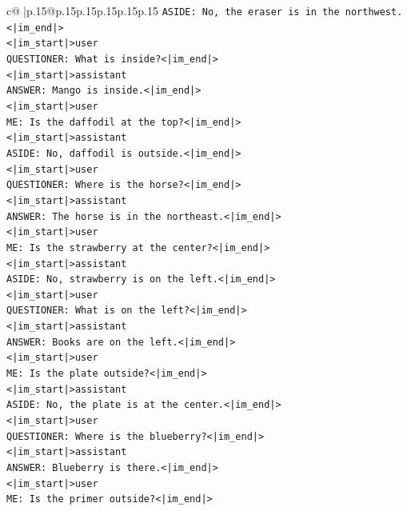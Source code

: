 \documentclass{article}
\begin{document}
{\begin{supertabular}{c@{$\;$}|p{.15\linewidth}@{}p{.15\linewidth}p{.15\linewidth}p{.15\linewidth}p{.15\linewidth}p{.15\linewidth}}
{{{\texttt{ASIDE: No, the eraser is in the northwest.<|im\_end|>} \\
\texttt{<|im\_start|>user} \\
\texttt{QUESTIONER: What is inside?<|im\_end|>} \\
\texttt{<|im\_start|>assistant} \\
\texttt{ANSWER: Mango is inside.<|im\_end|>} \\
\texttt{<|im\_start|>user} \\
\texttt{ME: Is the daffodil at the top?<|im\_end|>} \\
\texttt{<|im\_start|>assistant} \\
\texttt{ASIDE: No, daffodil is outside.<|im\_end|>} \\
\texttt{<|im\_start|>user} \\
\texttt{QUESTIONER: Where is the horse?<|im\_end|>} \\
\texttt{<|im\_start|>assistant} \\
\texttt{ANSWER: The horse is in the northeast.<|im\_end|>} \\
\texttt{<|im\_start|>user} \\
\texttt{ME: Is the strawberry at the center?<|im\_end|>} \\
\texttt{<|im\_start|>assistant} \\
\texttt{ASIDE: No, strawberry is on the left.<|im\_end|>} \\
\texttt{<|im\_start|>user} \\
\texttt{QUESTIONER: What is on the left?<|im\_end|>} \\
\texttt{<|im\_start|>assistant} \\
\texttt{ANSWER: Books are on the left.<|im\_end|>} \\
\texttt{<|im\_start|>user} \\
\texttt{ME: Is the plate outside?<|im\_end|>} \\
\texttt{<|im\_start|>assistant} \\
\texttt{ASIDE: No, the plate is at the center.<|im\_end|>} \\
\texttt{<|im\_start|>user} \\
\texttt{QUESTIONER: Where is the blueberry?<|im\_end|>} \\
\texttt{<|im\_start|>assistant} \\
\texttt{ANSWER: Blueberry is there.<|im\_end|>} \\
\texttt{<|im\_start|>user} \\
\texttt{ME: Is the primer outside?<|im\_end|>} \\
}}}
\end{supertabular}}
\end{document}
